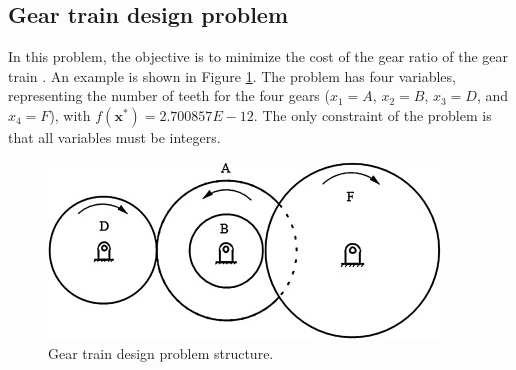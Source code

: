 
\subsection*{Gear train design problem}

In this problem, the objective is to minimize the cost of the gear ratio of the gear train \citep{PV}. An example is shown in Figure \ref{fig:GT}. The problem has four variables, representing the number of teeth for the four gears ($x_1 = A$, $x_2 = B$, $x_3 = D$, and $x_4 = F$), with $f(\bm{x}^*) = 2.700857E \! - \! 12$. The only constraint of the problem is that all variables must be integers.


\begin{figure}[h]
    \begin{center}
    \includegraphics[scale=0.6]{Imgs/GT.jpg}
    \end{center}
    \captionsetup{justification=centering}
    \caption{Gear train design problem structure.}\label{fig:GT}
\end{figure}

